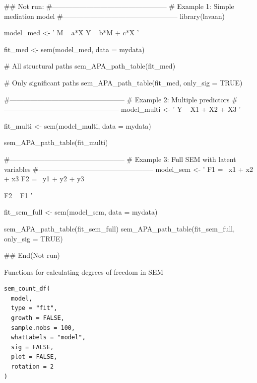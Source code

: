 \documentclass[a4paper]{book}
\begin{document}
\begin{Examples}
\begin{ExampleCode}
## Not run: 
#--------------------------------------------------
# Example 1: Simple mediation model
#--------------------------------------------------
library(lavaan)

model_med <- '
  M ~ a*X
  Y ~ b*M + c*X
'

fit_med <- sem(model_med, data = mydata)

# All structural paths
sem_APA_path_table(fit_med)

# Only significant paths
sem_APA_path_table(fit_med, only_sig = TRUE)

#--------------------------------------------------
# Example 2: Multiple predictors
#--------------------------------------------------
model_multi <- '
  Y ~ X1 + X2 + X3
'

fit_multi <- sem(model_multi, data = mydata)

sem_APA_path_table(fit_multi)

#--------------------------------------------------
# Example 3: Full SEM with latent variables
#--------------------------------------------------
model_sem <- '
  F1 =~ x1 + x2 + x3
  F2 =~ y1 + y2 + y3

  F2 ~ F1
'

fit_sem_full <- sem(model_sem, data = mydata)

sem_APA_path_table(fit_sem_full)
sem_APA_path_table(fit_sem_full, only_sig = TRUE)

## End(Not run)
\end{ExampleCode}
\end{Examples}
%
\begin{Description}
Functions for calculating degrees of freedom in SEM
\end{Description}
%
\begin{Usage}
\begin{verbatim}
sem_count_df(
  model,
  type = "fit",
  growth = FALSE,
  sample.nobs = 100,
  whatLabels = "model",
  sig = FALSE,
  plot = FALSE,
  rotation = 2
)
\end{verbatim}
\end{Usage}
%
\end{document}
